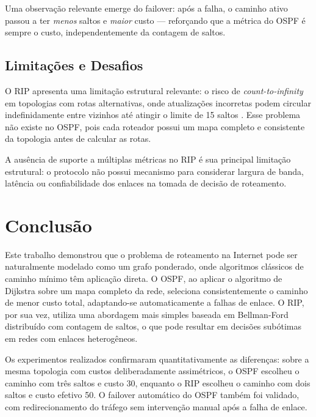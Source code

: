 \documentclass[12pt]{article}
\begin{document}
Uma observação relevante emerge do failover: após a falha, o caminho ativo passou a
ter \textit{menos} saltos e \textit{maior} custo — reforçando que a métrica do OSPF
é sempre o custo, independentemente da contagem de saltos.

\subsection{Limitações e Desafios}

O RIP apresenta uma limitação estrutural relevante: o risco de
\textit{count-to-infinity} em topologias com rotas alternativas, onde atualizações
incorretas podem circular indefinidamente entre vizinhos até atingir o limite de 15
saltos \cite{rfc2453}. Esse problema não existe no OSPF, pois cada roteador possui
um mapa completo e consistente da topologia antes de calcular as rotas.

A ausência de suporte a múltiplas métricas no RIP é sua principal limitação
estrutural: o protocolo não possui mecanismo para considerar largura de banda,
latência ou confiabilidade dos enlaces na tomada de decisão de roteamento.

\section{Conclusão}
\label{sec:conclusao}

Este trabalho demonstrou que o problema de roteamento na Internet pode ser
naturalmente modelado como um grafo ponderado, onde algoritmos clássicos de caminho
mínimo têm aplicação direta. O OSPF, ao aplicar o algoritmo de Dijkstra sobre um
mapa completo da rede, seleciona consistentemente o caminho de menor custo total,
adaptando-se automaticamente a falhas de enlace. O RIP, por sua vez, utiliza uma
abordagem mais simples baseada em Bellman-Ford distribuído com contagem de saltos, o
que pode resultar em decisões subótimas em redes com enlaces heterogêneos.

Os experimentos realizados confirmaram quantitativamente as diferenças: sobre a
mesma topologia com custos deliberadamente assimétricos, o OSPF escolheu o caminho
com três saltos e custo 30, enquanto o RIP escolheu o caminho com dois saltos e
custo efetivo 50. O failover automático do OSPF também foi validado, com
redirecionamento do tráfego sem intervenção manual após a falha de enlace.
\end{document}

